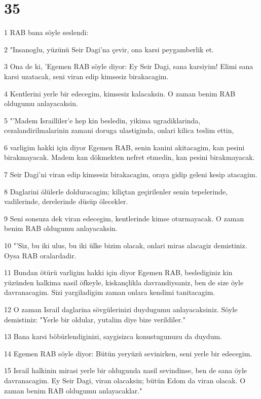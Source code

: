 \chapter{35}

\par 1 RAB bana söyle seslendi:
\par 2 "Insanoglu, yüzünü Seir Dagi'na çevir, ona karsi peygamberlik et.
\par 3 Ona de ki, 'Egemen RAB söyle diyor: Ey Seir Dagi, sana karsiyim! Elimi sana karsi uzatacak, seni viran edip kimsesiz birakacagim.
\par 4 Kentlerini yerle bir edecegim, kimsesiz kalacaksin. O zaman benim RAB oldugumu anlayacaksin.
\par 5 "'Madem Israilliler'e hep kin besledin, yikima ugradiklarinda, cezalandirilmalarinin zamani doruga ulastiginda, onlari kilica teslim ettin,
\par 6 varligim hakki için diyor Egemen RAB, senin kanini akitacagim, kan pesini birakmayacak. Madem kan dökmekten nefret etmedin, kan pesini birakmayacak.
\par 7 Seir Dagi'ni viran edip kimsesiz birakacagim, oraya gidip geleni kesip atacagim.
\par 8 Daglarini ölülerle dolduracagim; kiliçtan geçirilenler senin tepelerinde, vadilerinde, derelerinde düsüp ölecekler.
\par 9 Seni sonsuza dek viran edecegim, kentlerinde kimse oturmayacak. O zaman benim RAB oldugumu anlayacaksin.
\par 10 "'Siz, bu iki ulus, bu iki ülke bizim olacak, onlari miras alacagiz demistiniz. Oysa RAB oralardadir.
\par 11 Bundan ötürü varligim hakki için diyor Egemen RAB, beslediginiz kin yüzünden halkima nasil öfkeyle, kiskançlikla davrandiysaniz, ben de size öyle davranacagim. Sizi yargiladigim zaman onlara kendimi tanitacagim.
\par 12 O zaman Israil daglarina sövgülerinizi duydugumu anlayacaksiniz. Söyle demistiniz: "Yerle bir oldular, yutalim diye bize verildiler."
\par 13 Bana karsi böbürlendiginizi, saygisizca konustugunuzu da duydum.
\par 14 Egemen RAB söyle diyor: Bütün yeryüzü sevinirken, seni yerle bir edecegim.
\par 15 Israil halkinin mirasi yerle bir oldugunda nasil sevindinse, ben de sana öyle davranacagim. Ey Seir Dagi, viran olacaksin; bütün Edom da viran olacak. O zaman benim RAB oldugumu anlayacaklar."

